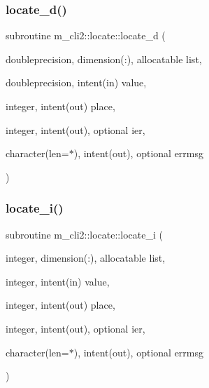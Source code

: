 \mbox{\label{interfacem__cli2_1_1locate_ac8d6a83fb2617b1a370d6f4142cfbf6b}} 
\subsubsection{\texorpdfstring{locate\+\_\+d()}{locate\_d()}}
{\footnotesize\ttfamily subroutine m\+\_\+cli2\+::locate\+::locate\+\_\+d (\begin{DoxyParamCaption}\item[{doubleprecision, dimension(\+:), allocatable}]{list,  }\item[{doubleprecision, intent(in)}]{value,  }\item[{integer, intent(out)}]{place,  }\item[{integer, intent(out), optional}]{ier,  }\item[{character(len=$\ast$), intent(out), optional}]{errmsg }\end{DoxyParamCaption})\hspace{0.3cm}{\ttfamily [private]}}

\mbox{\label{interfacem__cli2_1_1locate_a4bc5036ad18af931624efb52459bdef3}} 
\subsubsection{\texorpdfstring{locate\+\_\+i()}{locate\_i()}}
{\footnotesize\ttfamily subroutine m\+\_\+cli2\+::locate\+::locate\+\_\+i (\begin{DoxyParamCaption}\item[{integer, dimension(\+:), allocatable}]{list,  }\item[{integer, intent(in)}]{value,  }\item[{integer, intent(out)}]{place,  }\item[{integer, intent(out), optional}]{ier,  }\item[{character(len=$\ast$), intent(out), optional}]{errmsg }\end{DoxyParamCaption})\hspace{0.3cm}{\ttfamily [private]}}


